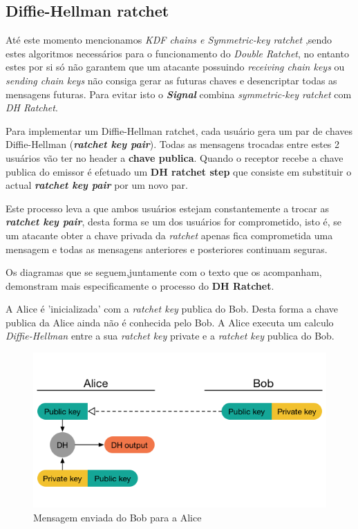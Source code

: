 \subsection{Diffie-Hellman ratchet}\label{sec:dhratchet}
Até este momento mencionamos \textit{KDF chains e Symmetric-key ratchet} ,sendo estes algoritmos necessários para o funcionamento do \textit{Double Ratchet}, no entanto estes por si só não garantem que um atacante possuindo \textit{receiving chain keys} ou \textit{sending chain keys} não consiga gerar as futuras chaves e desencriptar todas as mensagens futuras. Para evitar isto o \textbf{\textit{Signal}} combina \textit{symmetric-key ratchet} com \textit{DH Ratchet}.

Para implementar um Diffie-Hellman ratchet, cada usuário gera um par de chaves Diffie-Hellman (\textit{\textbf{ratchet key pair}}). Todas as mensagens trocadas entre estes 2 usuários vão ter no header a \textbf{chave publica}. Quando o receptor recebe a chave publica do emissor é efetuado um \textbf{DH ratchet step} que consiste em substituir o actual \textbf{\textit{ratchet key pair}} por um novo par.

Este processo leva a que ambos usuários estejam constantemente a trocar as \textbf{\textit{ratchet key pair}}, desta forma se um dos usuários for comprometido, isto é, se um atacante obter a chave privada da \textit{ratchet} apenas fica comprometida uma mensagem e todas as mensagens anteriores e posteriores continuam seguras.

Os diagramas que se seguem,juntamente com o texto que os acompanham, demonstram mais especificamente o processo do \textbf{DH Ratchet}.


A Alice é 'inicializada' com a \textit{ratchet key} publica do Bob. Desta forma a chave publica da Alice ainda não é conhecida pelo Bob. A Alice executa um calculo \textit{Diffie-Hellman} entre a sua \textit{ratchet key} private e a \textit{ratchet key} publica do Bob.

\begin{figure}[H]
\begin{center}
\includegraphics[width=12cm]{img/DH1.png}
\caption{Mensagem enviada do Bob para a Alice}
\label{diagram:DH1}
\centering
\end{center}
\end{figure}

